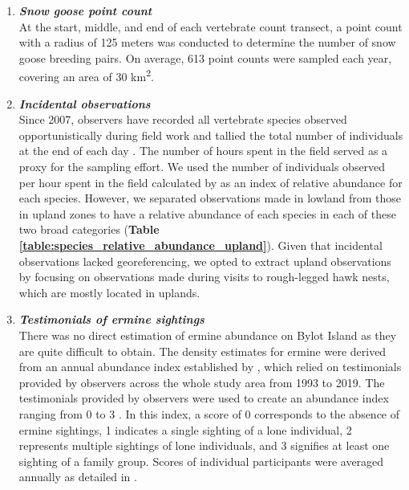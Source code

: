 \documentclass[a4paper,twoside,10pt]{article}
\begin{document}
\begin{enumerate}[label=\roman*]
\item[] \textit{\textbf{Snow goose point count}}\\
At the start, middle, and end of each vertebrate count transect, a point count with a radius of 125 meters was conducted to determine the number of snow goose breeding pairs. On average, 613  point counts were sampled each year, covering an area of 30  km\textsuperscript{2}.
\\

\item[] \textit{\textbf{Incidental observations}}\\
Since 2007, observers have recorded all vertebrate species observed opportunistically during field work and tallied the total number of individuals at the end of each day \citep{gauthier2020daily, gauthier2024a}. The number of hours spent in the field served as a proxy for the sampling effort. We used the number of individuals observed per hour spent in the field calculated by \citet{gauthier2024a} as an index of relative abundance for each species. However, we separated observations made in lowland from those in upland zones to have a relative abundance of each species in each of these two broad categories (\textbf{Table \ref{table:species_relative_abundance_upland}}). Given that incidental observations lacked georeferencing, we opted to extract upland observations by focusing on observations made during visits to rough-legged hawk nests, which are mostly located in uplands. \\


\newpage

\item[] \textit{\textbf{Testimonials of ermine sightings}}\\
There was no direct estimation of ermine abundance on Bylot Island as they are quite difficult to obtain. The density estimates for ermine were derived from an annual abundance index established by \citet{bolduc2023}, which relied on testimonials provided by observers across the whole study area from 1993 to 2019. The testimonials provided by observers were used to create an abundance index ranging from 0 to 3 \citep{bolduc2023}. In this index, a score of 0 corresponds to the absence of ermine sightings, 1 indicates a single sighting of a lone individual, 2 represents multiple sightings of lone individuals, and 3 signifies at least one sighting of a family group. Scores of individual participants were averaged annually as detailed in \citet{bolduc2023}. 
\end{enumerate}
\end{document}

